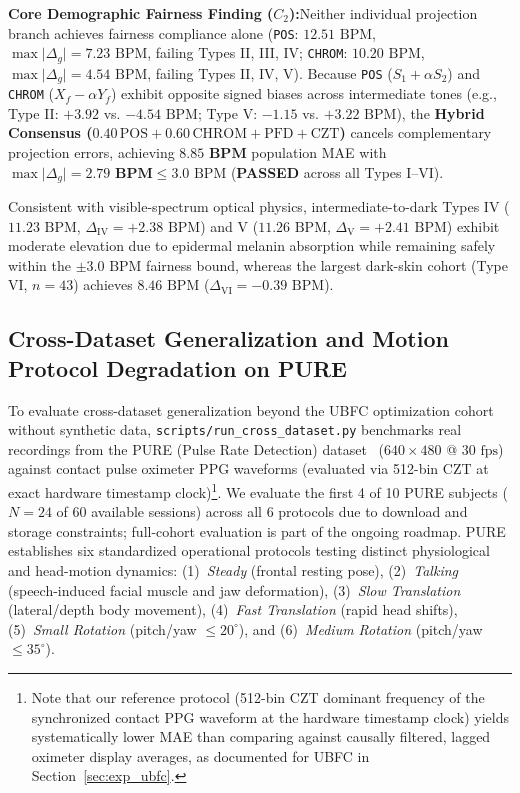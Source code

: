 \documentclass[conference]{IEEEtran}
\newcommand{\takeaway}[2]{%
  \vspace{3pt}\noindent\colorbox{gray!10}{%
    \parbox{\dimexpr\columnwidth-2\fboxsep\relax}{%
      \vspace{2pt}\footnotesize\textbf{#1:}\hspace{0.4em}#2\vspace{2pt}%
    }%
  }\vspace{3pt}%
}
\begin{document}
\takeaway{Core Demographic Fairness Finding ($C_2$)}{Neither individual projection branch achieves fairness compliance alone (\texttt{POS}: $12.51\text{ BPM}$, $\max\lvert\Delta_g\rvert = 7.23\text{ BPM}$, failing Types II, III, IV; \texttt{CHROM}: $10.20\text{ BPM}$, $\max\lvert\Delta_g\rvert = 4.54\text{ BPM}$, failing Types II, IV, V). Because \texttt{POS} ($S_1 + \alpha S_2$) and \texttt{CHROM} ($X_f - \alpha Y_f$) exhibit opposite signed biases across intermediate tones (e.g., Type II: $+3.92$ vs. $-4.54\text{ BPM}$; Type V: $-1.15$ vs. $+3.22\text{ BPM}$), the \textbf{Hybrid Consensus ($0.40\,\text{POS} + 0.60\,\text{CHROM} + \text{PFD} + \text{CZT}$)} cancels complementary projection errors, achieving $\mathbf{8.85\text{ BPM}}$ population MAE with $\max\lvert\Delta_g\rvert = \mathbf{2.79\text{ BPM}} \le 3.0\text{ BPM}$ (\textbf{PASSED} across all Types I--VI).}

Consistent with visible-spectrum optical physics, intermediate-to-dark Types IV ($11.23\text{ BPM}$, $\Delta_{\text{IV}} = +2.38\text{ BPM}$) and V ($11.26\text{ BPM}$, $\Delta_{\text{V}} = +2.41\text{ BPM}$) exhibit moderate elevation due to epidermal melanin absorption while remaining safely within the $\pm 3.0\text{ BPM}$ fairness bound, whereas the largest dark-skin cohort (Type VI, $n=43$) achieves $8.46\text{ BPM}$ ($\Delta_{\text{VI}} = -0.39\text{ BPM}$).

\subsection{Cross-Dataset Generalization and Motion Protocol Degradation on PURE}
\label{sec:pure}

To evaluate cross-dataset generalization beyond the UBFC optimization cohort without synthetic data, \texttt{scripts/run\_cross\_dataset.py} benchmarks real recordings from the PURE (Pulse Rate Detection) dataset~\cite{stricker2014pure} ($640\times 480$ @ $30\text{ fps}$) against contact pulse oximeter PPG waveforms (evaluated via 512-bin CZT at exact hardware timestamp clock)\footnote{Note that our reference protocol (512-bin CZT dominant frequency of the synchronized contact PPG waveform at the hardware timestamp clock) yields systematically lower MAE than comparing against causally filtered, lagged oximeter display averages, as documented for UBFC in Section~\ref{sec:exp_ubfc}.}. We evaluate the first 4 of 10 PURE subjects ($N = 24$ of 60 available sessions) across all 6 protocols due to download and storage constraints; full-cohort evaluation is part of the ongoing roadmap. PURE establishes six standardized operational protocols testing distinct physiological and head-motion dynamics: (1)~\emph{Steady} (frontal resting pose), (2)~\emph{Talking} (speech-induced facial muscle and jaw deformation), (3)~\emph{Slow Translation} (lateral/depth body movement), (4)~\emph{Fast Translation} (rapid head shifts), (5)~\emph{Small Rotation} (pitch/yaw $\le 20^\circ$), and (6)~\emph{Medium Rotation} (pitch/yaw $\le 35^\circ$).
\end{document}
